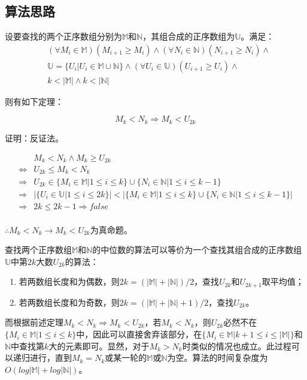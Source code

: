 
\subsection{算法思路}

设要查找的两个正序数组分别为$\mathbb M$和$\mathbb N$，其组合成的正序数组为$\mathbb U$。满足：
$$
\begin{aligned}
    &(\forall M_i\in\mathbb M)(M_{i+1}\geq M_i)\wedge(\forall N_i\in\mathbb N)(N_{i+1}\geq N_i)\wedge\\
    &\mathbb U=\{U_i|U_i\in\mathbb M\cup\mathbb N\}\wedge(\forall U_i\in\mathbb U)(U_{i+1}\geq U_i)\wedge\\
    &k<|\mathbb M|\wedge k<|\mathbb N|
\end{aligned}
$$

则有如下定理：

$$
M_k<N_k\Rightarrow M_k<U_{2k}
$$

证明：反证法。

$$
\begin{aligned}
    &M_k<N_k\wedge M_k\geq U_{2k}\\
    \Leftrightarrow& U_{2k}\leq M_k<N_k\\
    \Rightarrow& U_{2k}\in\{M_i\in\mathbb{M}|1\leq i\leq k\}\cup\{N_i\in\mathbb{N}|1\leq i\leq k-1\}\\
    \Rightarrow &|\{U_i\in\mathbb{U}|1\leq i\leq 2k\}|<|\{M_i\in\mathbb{M}|1\leq i\leq k\}\cup\{N_i\in\mathbb{N}|1\leq i\leq k-1\}|\\
    \Rightarrow &2k\leq 2k-1\Rightarrow false\\
\end{aligned}
$$

$\therefore M_k<N_k\rightarrow M_k<U_{2k}$为真命题。

查找两个正序数组$\mathbb M$和$\mathbb N$的中位数的算法可以等价为一个查找其组合成的正序数组$\mathbb U$中第$2k$大数$U_{2k}$的算法：
\begin{enumerate}
    \item 若两数组长度和为偶数，则$2k=(|\mathbb M|+|\mathbb N|)/2$，查找$U_{2k}$和$U_{2k+1}$取平均值；
    \item 若两数组长度和为奇数，则$2k=(|\mathbb M|+|\mathbb N|+1)/2$，查找$U_{2k}$。
\end{enumerate}

而根据前述定理$M_k<N_k\Rightarrow M_k<U_{2k}$，若$M_k<N_k$，则$U_{2k}$必然不在$\{M_i\in\mathbb{M}|1\leq i\leq k\}$中，因此可以直接舍弃该部分，在$\{M_i\in\mathbb{M}|k+1\leq i\leq |\mathbb M|\}$和$\mathbb N$中查找第$k$大的元素即可。显然，对于$M_k>N_k$时类似的情况也成立。此过程可以递归进行，直到$M_k=N_k$或某一轮的$\mathbb{M}$或$\mathbb{N}$为空。算法的时间复杂度为$O(log|\mathbb M|+log|\mathbb N|)$。

